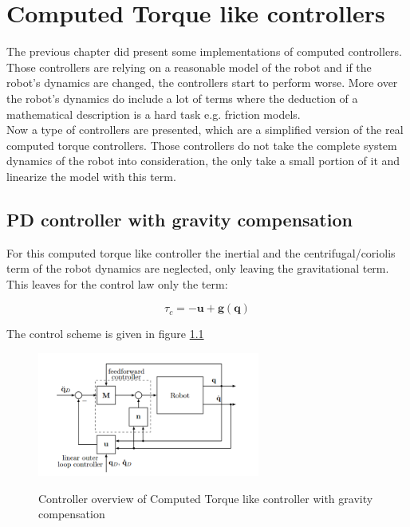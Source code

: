 \chapter{ Computed Torque like controllers}

The previous chapter did present some implementations of computed controllers. Those controllers are relying on a reasonable model of the robot and if the robot's dynamics are changed, the controllers start to perform worse. More over the robot's dynamics do include a lot of terms where the deduction of a mathematical description is a hard task e.g. friction models. \\ 
Now a type of controllers are presented, which are a simplified version of the real computed torque controllers. Those controllers do not take the complete system dynamics of the robot into consideration, the only take a small portion of it and linearize the model with this term. 

\section{PD controller with gravity compensation}

For this computed torque like controller the inertial and the centrifugal/coriolis term of the robot dynamics are neglected, only leaving the gravitational term. This leaves for the control law only the term:

\begin{equation*}
\tau_c = -\mathbf{u} + \mathbf{g}(\mathbf{q})
\end{equation*}

The control scheme is given in figure \ref{fig:ctLike_overview}
\begin{figure}[]
	\centering
	\includegraphics[width=0.65\textwidth]{pics/ct_controller.png}\\
	\caption{Controller overview of Computed Torque like controller with gravity compensation}
	\label{fig:ctLike_overview}
\end{figure}

